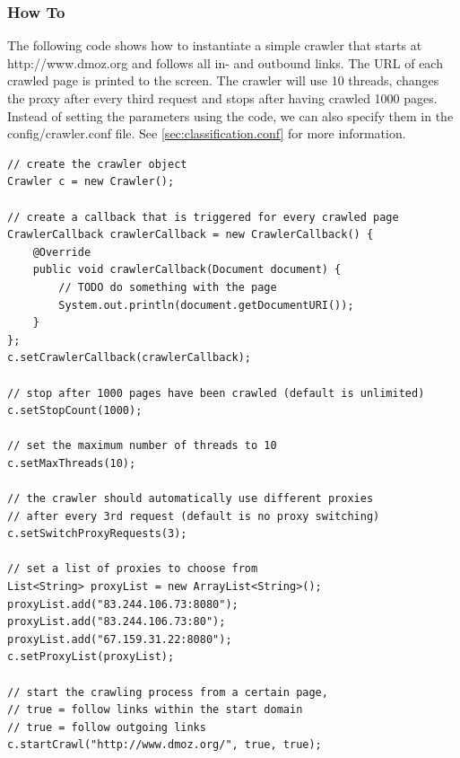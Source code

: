 \documentclass[a4paper,twoside]{book}      %
\begin{document}
\subsubsection{How To}
The following code shows how to instantiate a simple crawler that starts at http://www.dmoz.org and follows all in- and outbound links. The URL of each crawled page is printed to the screen. The crawler will use 10 threads, changes the proxy after every third request and stops after having crawled 1000 pages. Instead of setting the parameters using the code, we can also specify them in the config/crawler.conf file. See \ref{sec:classification.conf} for more information.

\begin{codelisting}
\begin{lstlisting}[frame=tb]
// create the crawler object
Crawler c = new Crawler();

// create a callback that is triggered for every crawled page
CrawlerCallback crawlerCallback = new CrawlerCallback() {
	@Override
	public void crawlerCallback(Document document) {
		// TODO do something with the page
		System.out.println(document.getDocumentURI());
	}
};
c.setCrawlerCallback(crawlerCallback);

// stop after 1000 pages have been crawled (default is unlimited)
c.setStopCount(1000);

// set the maximum number of threads to 10
c.setMaxThreads(10);

// the crawler should automatically use different proxies
// after every 3rd request (default is no proxy switching)
c.setSwitchProxyRequests(3);

// set a list of proxies to choose from
List<String> proxyList = new ArrayList<String>();
proxyList.add("83.244.106.73:8080");
proxyList.add("83.244.106.73:80");
proxyList.add("67.159.31.22:8080");
c.setProxyList(proxyList);

// start the crawling process from a certain page,
// true = follow links within the start domain
// true = follow outgoing links
c.startCrawl("http://www.dmoz.org/", true, true);
\end{lstlisting}
\end{codelisting}
\end{document}
